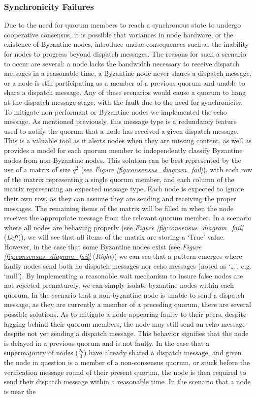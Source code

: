 \subsubsection{Synchronicity Failures}\label{struc:sync_fail}
Due to the need for quorum members to reach a synchronous state to undergo cooperative consensus, it is possible that variances in node hardware, or the existence of Byzantine nodes, introduce undue consequences such as the inability for nodes to progress beyond dispatch messages. The reasons for such a scenario to occur are several: a node lacks the bandwidth necessary to receive dispatch messages in a reasonable time, a Byzantine node never shares a dispatch message, or a node is still participating as a member of a previous quorum and unable to share a dispatch message. Any of these scenarios would cause a quorum to hang at the dispatch message stage, with the fault due to the need for synchronicity. To mitigate non-performant or Byzantine nodes we implemented the echo message. As mentioned previously, this message type is a redundancy feature used to notify the quorum that a node has received a given dispatch message. This is a valuable tool as it alerts nodes when they are missing content, as well as provides a model for each quorum member to independently classify Byzantine nodes from non-Byzantine nodes. This solution can be best represented by the use of a matrix of size \(q^2\) (see \textit{Figure \ref{fig:consensus_diagram_fail}}), with each row of the matrix representing a single quorum member, and each column of the matrix representing an expected message type. Each node is expected to ignore their own row, as they can assume they are sending and receiving the proper messages. The remaining items of the matrix will be filled in when the node receives the appropriate message from the relevant quorum member. In a scenario where all nodes are behaving properly (see \textit{Figure \ref{fig:consensus_diagram_fail}} (\textit{Left})), we will see that all items of the matrix are storing a ‘True’ value. However, in the case that some Byzantine nodes exist (see \textit{Figure \ref{fig:consensus_diagram_fail}} (\textit{Right})) we can see that a pattern emerges where faulty nodes send both no dispatch messages nor echo messages (noted as ‘…’, e.g. ‘null'). By implementing a reasonable wait mechanism to insure false nodes are not rejected prematurely, we can simply isolate byzantine nodes within each quorum. In the scenario that a non-byzantine node is unable to send a dispatch message, as they are currently a member of a preceding quorum, there are several possible solutions. As to mitigate a node appearing faulty to their peers, despite lagging behind their quorum members, the node may still send an echo message despite not yet sending a dispatch message. This behavior signifies that the node is delayed in a previous quorum and is not faulty. In the case that a supermajority of nodes (\(\frac{2q}{3}\)) have already shared a dispatch message, and given the node in question is a member of a non-consensus quorum, or stuck before the verification message round of their present quorum, the node is then required to send their dispatch message within a reasonable time. In the scenario that a node is near the 